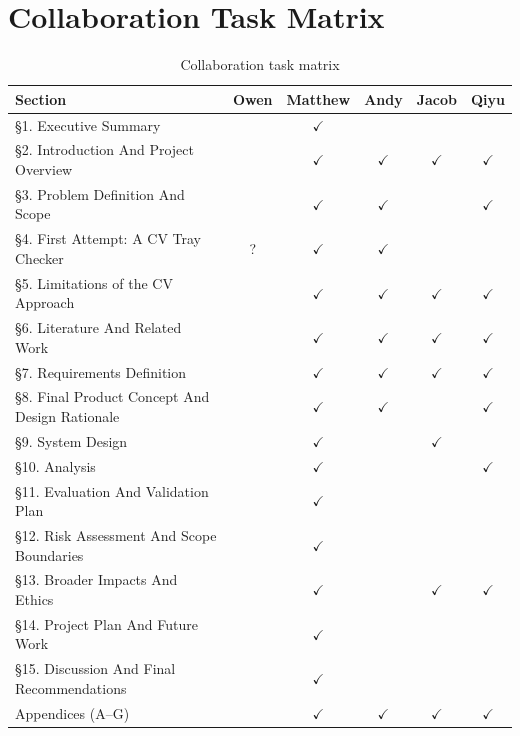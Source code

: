 \documentclass[10pt,a4paper]{article}
\begin{document}
\section{Collaboration Task Matrix}

\begin{table}[H]
\centering
\caption{Collaboration task matrix}
\label{tab:collaboration-task-matrix}
\small\renewcommand{\arraystretch}{1.2}\setlength{\tabcolsep}{4pt}
\begin{tabularx}{\textwidth}{|>{\raggedright\arraybackslash}X|c|c|c|c|c|}
\hline
Section & Owen & Matthew & Andy & Jacob & Qiyu \\
\hline
§1. Executive Summary & & $\checkmark$ & & & \\
\hline
§2. Introduction And Project Overview & & $\checkmark$ & $\checkmark$ & $\checkmark$ & $\checkmark$ \\
\hline
§3. Problem Definition And Scope & & $\checkmark$ & $\checkmark$ & & $\checkmark$ \\
\hline
§4. First Attempt: A CV Tray Checker & ? & $\checkmark$ & $\checkmark$ & & \\
\hline
§5. Limitations of the CV Approach & & $\checkmark$ & $\checkmark$ & $\checkmark$ & $\checkmark$ \\
\hline
§6. Literature And Related Work & & $\checkmark$ & $\checkmark$ & $\checkmark$ & $\checkmark$ \\
\hline
§7. Requirements Definition & & $\checkmark$ & $\checkmark$ & $\checkmark$ & $\checkmark$ \\
\hline
§8. Final Product Concept And Design Rationale & & $\checkmark$ & $\checkmark$ & & $\checkmark$ \\
\hline
§9. System Design & & $\checkmark$ & & $\checkmark$ & \\
\hline
§10. Analysis & & $\checkmark$ & & & $\checkmark$ \\
\hline
§11. Evaluation And Validation Plan & & $\checkmark$ & & & \\
\hline
§12. Risk Assessment And Scope Boundaries & & $\checkmark$ & & & \\
\hline
§13. Broader Impacts And Ethics & & $\checkmark$ & & $\checkmark$ & $\checkmark$ \\
\hline
§14. Project Plan And Future Work & & $\checkmark$ & & & \\
\hline
§15. Discussion And Final Recommendations & & $\checkmark$ & & & \\
\hline
Appendices (A--G) & & $\checkmark$ & $\checkmark$ & $\checkmark$ & $\checkmark$ \\
\hline
\hline
\end{tabularx}
\end{table}
\end{document}
